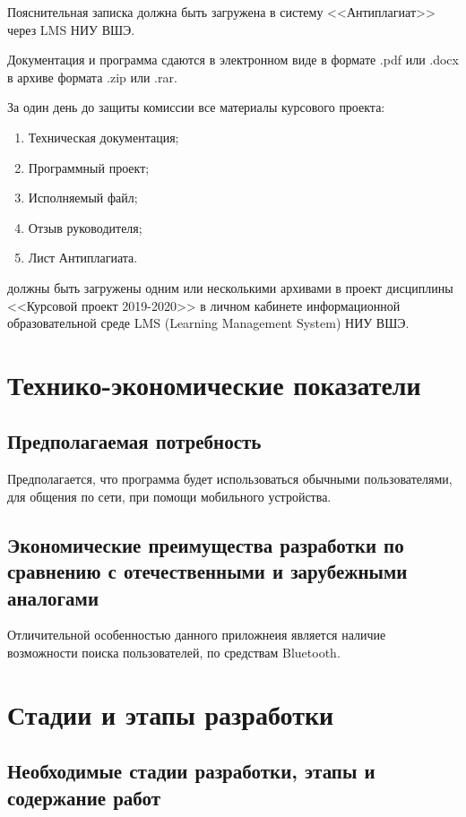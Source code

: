 \documentclass[techtask]{espd}
\begin{document}
Пояснительная записка должна быть загружена в систему <<Антиплагиат>> через LMS НИУ ВШЭ.

Документация и программа сдаются в электронном виде в формате .pdf или .docx в архиве формата .zip или .rar.

За один день до защиты комиссии все материалы курсового проекта:
\begin{enumerate}
\item Техническая документация;
\item Программный проект;
\item Исполняемый файл;
\item Отзыв руководителя;
\item Лист Антиплагиата.
\end{enumerate}
должны быть загружены одним или несколькими архивами в проект дисциплины <<Курсовой проект 2019-2020>> в личном кабинете информационной образовательной среде LMS (Learning Management System) НИУ ВШЭ.

\section{Технико-экономические показатели}
\subsection{Предполагаемая потребность}
Предполагается, что программа будет использоваться обычными пользователями, для общения по сети, при помощи мобильного устройства.

\subsection{Экономические преимущества разработки по сравнению с отечественными и зарубежными аналогами}
Отличительной особенностью данного приложнеия является наличие возможности поиска пользователей, по средствам Bluetooth.

\section{Стадии и этапы разработки}
\subsection{Необходимые стадии разработки, этапы и содержание работ}
\end{document}
